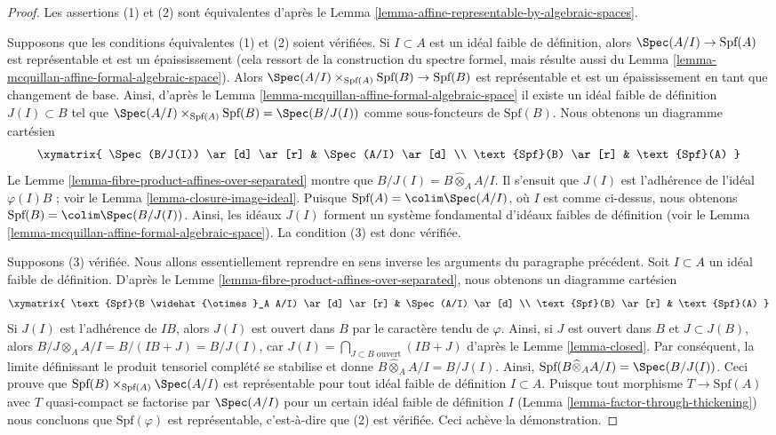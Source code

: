 \begin{proof}
Les assertions (1) et (2) sont équivalentes d'après le
Lemma \ref{lemma-affine-representable-by-algebraic-spaces}.

\medskip\noindent
Supposons que les conditions équivalentes (1) et (2) soient vérifiées.
Si $I \subset A$ est un idéal faible de définition, alors
$\Spec(A/I) \to \text{Spf}(A)$ est représentable et est un épaississement
(cela ressort de la construction du spectre formel,
mais résulte aussi du
Lemma \ref{lemma-mcquillan-affine-formal-algebraic-space}).
Alors $\Spec(A/I) \times_{\text{Spf}(A)} \text{Spf}(B) \to \text{Spf}(B)$
est représentable et est un épaississement en tant que changement de base.
Ainsi, d'après le
Lemma \ref{lemma-mcquillan-affine-formal-algebraic-space}
il existe un idéal faible de définition $J(I) \subset B$ tel que
$\Spec(A/I) \times_{\text{Spf}(A)} \text{Spf}(B) = \Spec(B/J(I))$
comme sous-foncteurs de $\text{Spf}(B)$. Nous obtenons un diagramme cartésien
$$
\xymatrix{
\Spec(B/J(I)) \ar[d] \ar[r] & \Spec(A/I) \ar[d] \\
\text{Spf}(B) \ar[r] & \text{Spf}(A)
}
$$
Le Lemme \ref{lemma-fibre-product-affines-over-separated}
montre que $B/J(I) = B \widehat{\otimes}_A A/I$.
Il s'ensuit que $J(I)$ est l'adhérence de l'idéal $\varphi(I)B$ ; voir le
Lemma \ref{lemma-closure-image-ideal}.
Puisque $\text{Spf}(A) = \colim \Spec(A/I)$, où $I$ est comme ci-dessus,
nous obtenons $\text{Spf}(B) = \colim \Spec(B/J(I))$.
Ainsi, les idéaux $J(I)$ forment un système fondamental d'idéaux faibles
de définition (voir le
Lemma \ref{lemma-mcquillan-affine-formal-algebraic-space}).
La condition (3) est donc vérifiée.

\medskip\noindent
Supposons (3) vérifiée. Nous allons essentiellement reprendre en sens inverse les
arguments du paragraphe précédent.
Soit $I \subset A$ un idéal faible de définition.
D'après le Lemme \ref{lemma-fibre-product-affines-over-separated},
nous obtenons un diagramme cartésien
$$
\xymatrix{
\text{Spf}(B \widehat{\otimes}_A A/I) \ar[d] \ar[r] & \Spec(A/I) \ar[d] \\
\text{Spf}(B) \ar[r] & \text{Spf}(A)
}
$$
Si $J(I)$ est l'adhérence de $IB$, alors $J(I)$ est ouvert dans $B$
par le caractère tendu de $\varphi$. Ainsi, si $J$ est ouvert dans $B$ et $J \subset J(B)$,
alors $B/J \otimes_A A/I = B/(IB + J) = B/J(I)$, car
$J(I) = \bigcap_{J \subset B\text{ ouvert}} (IB + J)$ d'après le Lemme \ref{lemma-closed}.
Par conséquent, la limite définissant le produit tensoriel complété se stabilise et donne
$B \widehat{\otimes}_A A/I = B/J(I)$.
Ainsi, $\text{Spf}(B \widehat{\otimes}_A A/I) = \Spec(B/J(I))$.
Ceci prouve que $\text{Spf}(B) \times_{\text{Spf}(A)} \Spec(A/I)$
est représentable pour tout idéal faible de définition $I \subset A$.
Puisque tout morphisme $T \to \text{Spf}(A)$ avec $T$ quasi-compact
se factorise par $\Spec(A/I)$ pour un certain idéal faible de définition $I$
(Lemma \ref{lemma-factor-through-thickening})
nous concluons que $\text{Spf}(\varphi)$ est représentable, c'est-à-dire que
(2) est vérifiée. Ceci achève la démonstration.
\end{proof}

